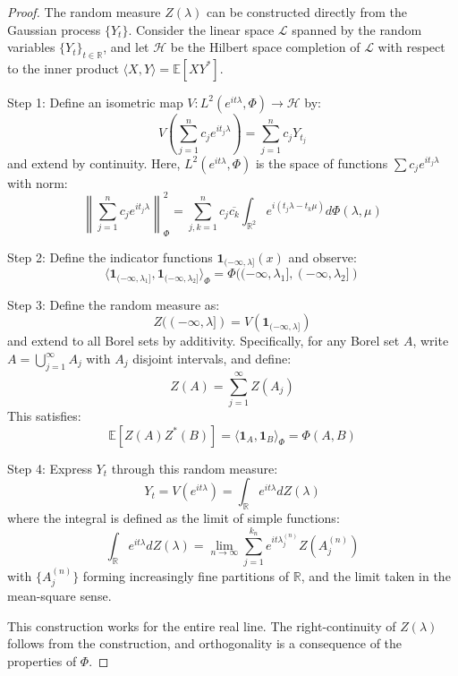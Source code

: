\documentclass{article}
\theoremstyle{plain}
\theoremstyle{definition}
\begin{document}
\begin{proof}
The random measure $Z(\lambda)$ can be constructed directly from the Gaussian process $\{Y_t\}$. Consider the linear space $\mathcal{L}$ spanned by the random variables $\{Y_t\}_{t \in \mathbb{R}}$, and let $\mathcal{H}$ be the Hilbert space completion of $\mathcal{L}$ with respect to the inner product $\langle X, Y \rangle = \mathbb{E}[XY^*]$.

Step 1: Define an isometric map $V: L^2(e^{it\lambda}, \Phi) \to \mathcal{H}$ by:
\begin{equation}
V\left(\sum_{j=1}^n c_j e^{it_j\lambda}\right) = \sum_{j=1}^n c_j Y_{t_j}
\end{equation}
and extend by continuity. Here, $L^2(e^{it\lambda}, \Phi)$ is the space of functions $\sum c_j e^{it_j\lambda}$ with norm:
\begin{equation}
\left\|\sum_{j=1}^n c_j e^{it_j\lambda}\right\|^2_{\Phi} = \sum_{j,k=1}^n c_j \overline{c_k} \int_{\mathbb{R}^2} e^{i(t_j\lambda-t_k\mu)} d\Phi(\lambda,\mu)
\end{equation}

Step 2: Define the indicator functions $\mathbf{1}_{(-\infty, \lambda]}(x)$ and observe:
\begin{equation}
\langle \mathbf{1}_{(-\infty, \lambda_1]}, \mathbf{1}_{(-\infty, \lambda_2]} \rangle_{\Phi} = \Phi((-\infty, \lambda_1], (-\infty, \lambda_2])
\end{equation}

Step 3: Define the random measure as:
\begin{equation}
Z((-\infty, \lambda]) = V(\mathbf{1}_{(-\infty, \lambda]})
\end{equation}
and extend to all Borel sets by additivity. Specifically, for any Borel set $A$, write $A = \bigcup_{j=1}^{\infty} A_j$ with $A_j$ disjoint intervals, and define:
\begin{equation}
Z(A) = \sum_{j=1}^{\infty} Z(A_j)
\end{equation}
This satisfies:
\begin{equation}
\mathbb{E}[Z(A)Z^*(B)] = \langle \mathbf{1}_A, \mathbf{1}_B \rangle_{\Phi} = \Phi(A,B)
\end{equation}

Step 4: Express $Y_t$ through this random measure:
\begin{equation}
Y_t = V(e^{it\lambda}) = \int_{\mathbb{R}} e^{it\lambda} dZ(\lambda)
\end{equation}
where the integral is defined as the limit of simple functions:
\begin{equation}
\int_{\mathbb{R}} e^{it\lambda} dZ(\lambda) = \lim_{n \to \infty} \sum_{j=1}^{k_n} e^{it\lambda_j^{(n)}} Z(A_j^{(n)})
\end{equation}
with $\{A_j^{(n)}\}$ forming increasingly fine partitions of $\mathbb{R}$, and the limit taken in the mean-square sense.

This construction works for the entire real line. The right-continuity of $Z(\lambda)$ follows from the construction, and orthogonality is a consequence of the properties of $\Phi$.
\end{proof}
\end{document}
